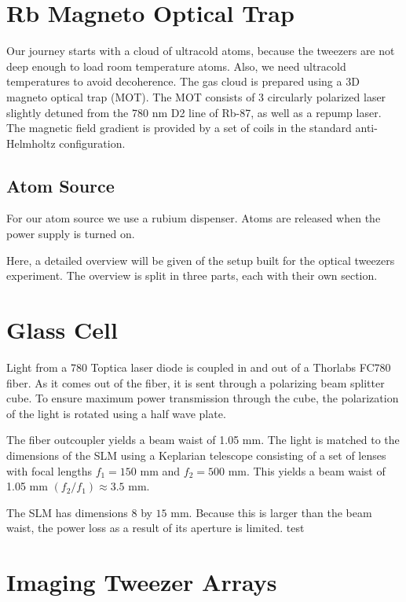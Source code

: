 \section{Rb Magneto Optical Trap}

Our journey starts with a cloud of ultracold atoms, because the tweezers are not deep enough to load room temperature atoms. Also, we need ultracold temperatures to avoid decoherence. The gas cloud is prepared using a 3D magneto optical trap (MOT). The MOT consists of 3 circularly polarized laser slightly detuned from the 780 nm D2 line of Rb-87, as well as a repump laser. The magnetic field gradient is provided by a set of coils in the standard anti-Helmholtz configuration. 

\subsection{Atom Source}

For our atom source we use a rubium dispenser. Atoms are released when the power supply is turned on. 

Here, a detailed overview will be given of the setup built for the optical tweezers experiment. The overview is split in three parts, each with their own section. 

\section{Glass Cell}

Light from a 780 Toptica laser diode is coupled in and out of a Thorlabs FC780 fiber. As it comes out of the fiber, it is sent through a polarizing beam splitter cube. To ensure maximum power transmission through the cube, the polarization of the light is rotated using a half wave plate. 

The fiber outcoupler yields a beam waist of 1.05 mm. The light is matched to the dimensions of the SLM using a Keplarian telescope consisting of a set of lenses with focal lengths $f_1=150$ mm and $f_2=500$ mm. This yields a beam waist of 1.05 mm $(f_2/f_1) \approx 3.5$ mm.

The SLM has dimensions $8$ by $15$ mm. Because this is larger than the beam waist, the power loss as a result of its aperture is limited. test

\section{Imaging Tweezer Arrays}

